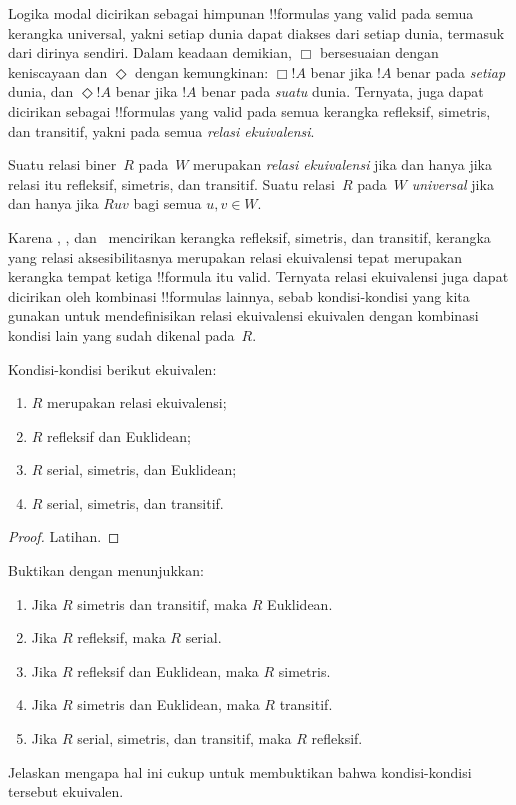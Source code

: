 \documentclass[../../../include/open-logic-section]{subfiles}
\begin{document}


Logika modal  dicirikan sebagai himpunan !!{formula}s yang valid pada
semua kerangka universal, yakni setiap dunia dapat diakses dari setiap dunia,
termasuk dari dirinya sendiri. Dalam keadaan demikian, $\Box$ bersesuaian
dengan keniscayaan dan $\Diamond$ dengan kemungkinan: $\Box !A$ benar jika
$!A$ benar pada \emph{setiap} dunia, dan $\Diamond !A$ benar jika $!A$ benar
pada \emph{suatu} dunia. Ternyata,  juga dapat dicirikan sebagai
!!{formula}s yang valid pada semua kerangka refleksif, simetris, dan transitif,
yakni pada semua \emph{relasi ekuivalensi}.

\begin{defn}
  Suatu relasi biner~$R$ pada~$W$ merupakan \emph{relasi ekuivalensi} jika dan
  hanya jika relasi itu refleksif, simetris, dan transitif. Suatu relasi~$R$
  pada~$W$ \emph{universal} jika dan hanya jika $Ruv$ bagi semua $u,v\in W$.
\end{defn}

Karena , , dan~ mencirikan kerangka refleksif, simetris, dan
transitif, kerangka yang relasi aksesibilitasnya merupakan relasi ekuivalensi
tepat merupakan kerangka tempat ketiga !!{formula} itu valid. Ternyata relasi
ekuivalensi juga dapat dicirikan oleh kombinasi !!{formula}s lainnya, sebab
kondisi-kondisi yang kita gunakan untuk mendefinisikan relasi ekuivalensi
ekuivalen dengan kombinasi kondisi lain yang sudah dikenal pada~$R$.

\begin{prop}
  Kondisi-kondisi berikut ekuivalen:
  \begin{enumerate}
  \item $R$ merupakan relasi ekuivalensi;
  \item $R$ refleksif dan Euklidean;
  \item $R$ serial, simetris, dan Euklidean;
  \item $R$ serial, simetris, dan transitif.
  \end{enumerate}
\end{prop}

\begin{proof}
  Latihan.
\end{proof}

\begin{prob}
  Buktikan  dengan menunjukkan:
  \begin{enumerate}
  \item Jika $R$ simetris dan transitif, maka $R$ Euklidean.
  \item Jika $R$ refleksif, maka $R$ serial.
  \item Jika $R$ refleksif dan Euklidean, maka $R$ simetris.
  \item Jika $R$ simetris dan Euklidean, maka $R$ transitif.
  \item Jika $R$ serial, simetris, dan transitif, maka $R$ refleksif.
  \end{enumerate}
  Jelaskan mengapa hal ini cukup untuk membuktikan bahwa kondisi-kondisi
  tersebut ekuivalen.
\end{prob}
\end{document}
